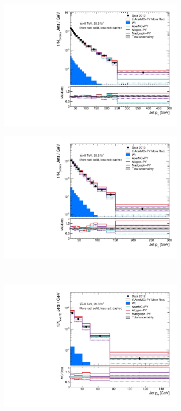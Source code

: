 \begin{figure}
\centering
\begin{subfigure}[]{0.45\textwidth}
\includegraphics[width=\textwidth]{fig/DataUnfold/LOSys/PtJet0.pdf}
\end{subfigure}
\begin{subfigure}[]{0.45\textwidth}
\includegraphics[width=\textwidth]{fig/DataUnfold/LOSys/PtJet1.pdf}
\end{subfigure} \\
\begin{subfigure}[]{0.45\textwidth}
\includegraphics[width=\textwidth]{fig/DataUnfold/LOSys/PtJet2.pdf}

\end{subfigure}
\end{figure}
